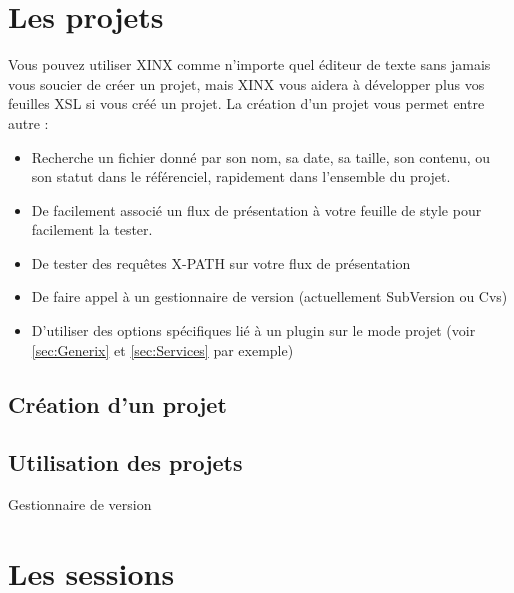\documentclass[a4paper,10pt,twoside]{book}
\begin{document}
\section{Les projets}
\label{sec:Projets}

Vous pouvez utiliser XINX comme n'importe quel éditeur de texte sans jamais vous soucier de créer un projet, mais XINX vous aidera à développer plus vos feuilles XSL si vous créé un projet. La création d'un projet vous permet entre autre : 

\begin{itemize}
 \item Recherche un fichier donné par son nom, sa date, sa taille, son contenu, ou son statut dans le référenciel, rapidement dans l'ensemble du projet.
 \item De facilement associé un flux de présentation à votre feuille de style pour facilement la tester.
 \item De tester des requêtes X-PATH sur votre flux de présentation
 \item De faire appel à un gestionnaire de version (actuellement SubVersion ou Cvs)
 \item D'utiliser des options spécifiques lié à un plugin sur le mode projet (voir \ref{sec:Generix} et \ref{sec:Services} par exemple)
\end{itemize}


\subsection{Création d'un projet}

\subsection{Utilisation des projets}
\label{sec:RCS}
Gestionnaire de version

\section{Les sessions}
\label{sec:Sessions}
\end{document}
